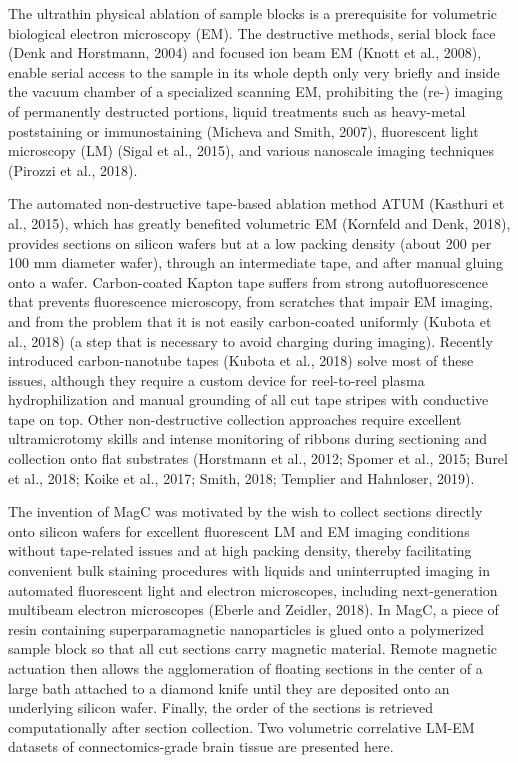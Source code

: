 \documentclass{article}
\begin{document}
The ultrathin physical ablation of sample blocks is a prerequisite for volumetric biological electron microscopy (EM). The destructive methods, serial block face (Denk and Horstmann, 2004) and focused ion beam EM (Knott et al., 2008), enable serial access to the sample in its whole depth only very briefly and inside the vacuum chamber of a specialized scanning EM, prohibiting the (re-) imaging of permanently destructed portions, liquid treatments such as heavy-metal poststaining or immunostaining (Micheva and Smith, 2007), fluorescent light microscopy (LM) (Sigal et al., 2015), and various nanoscale imaging techniques (Pirozzi et al., 2018).

The automated non-destructive tape-based ablation method ATUM (Kasthuri et al., 2015), which has greatly benefited volumetric EM (Kornfeld and Denk, 2018), provides sections on silicon wafers but at a low packing density (about 200 per 100 mm diameter wafer), through an intermediate tape, and after manual gluing onto a wafer. Carbon-coated Kapton tape suffers from strong autofluorescence that prevents fluorescence microscopy, from scratches that impair EM imaging, and from the problem that it is not easily carbon-coated uniformly (Kubota et al., 2018) (a step that is necessary to avoid charging during imaging). Recently introduced carbon-nanotube tapes (Kubota et al., 2018) solve most of these issues, although they require a custom device for reel-to-reel plasma hydrophilization and manual grounding of all cut tape stripes with conductive tape on top. Other non-destructive collection approaches require excellent ultramicrotomy skills and intense monitoring of ribbons during sectioning and collection onto flat substrates (Horstmann et al., 2012; Spomer et al., 2015; Burel et al., 2018; Koike et al., 2017; Smith, 2018; Templier and Hahnloser, 2019).

The invention of MagC was motivated by the wish to collect sections directly onto silicon wafers for excellent fluorescent LM and EM imaging conditions without tape-related issues and at high packing density, thereby facilitating convenient bulk staining procedures with liquids and uninterrupted imaging in automated fluorescent light and electron microscopes, including next-generation multibeam electron microscopes (Eberle and Zeidler, 2018). In MagC, a piece of resin containing superparamagnetic nanoparticles is glued onto a polymerized sample block so that all cut sections carry magnetic material. Remote magnetic actuation then allows the agglomeration of floating sections in the center of a large bath attached to a diamond knife until they are deposited onto an underlying silicon wafer. Finally, the order of the sections is retrieved computationally after section collection. Two volumetric correlative LM-EM datasets of connectomics-grade brain tissue are presented here.
\end{document}
